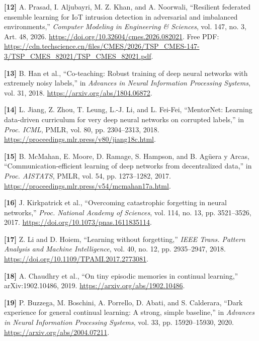 \documentclass[10pt,a4paper]{article}
\begin{document}
\par\noindent\textbf{[12]}  A. Prasad, I. Aljubayri, M. Z. Khan, and A. Noorwali, ``Resilient federated ensemble learning for IoT intrusion detection in adversarial and imbalanced environments,'' \emph{Computer Modeling in Engineering \& Sciences}, vol. 147, no. 3, Art. 48, 2026. \url{https://doi.org/10.32604/cmes.2026.082021}. Free PDF: \url{https://cdn.techscience.cn/files/CMES/2026/TSP_CMES-147-3/TSP_CMES_82021/TSP_CMES_82021.pdf}.

\par\noindent\textbf{[13]}  B. Han et al., ``Co-teaching: Robust training of deep neural networks with extremely noisy labels,'' in \emph{Advances in Neural Information Processing Systems}, vol. 31, 2018. \url{https://arxiv.org/abs/1804.06872}.


\par\noindent\textbf{[14]}  L. Jiang, Z. Zhou, T. Leung, L.-J. Li, and L. Fei-Fei, ``MentorNet: Learning data-driven curriculum for very deep neural networks on corrupted labels,'' in \emph{Proc. ICML}, PMLR, vol. 80, pp. 2304--2313, 2018. \url{https://proceedings.mlr.press/v80/jiang18c.html}.

\par\noindent\textbf{[15]}  B. McMahan, E. Moore, D. Ramage, S. Hampson, and B. Ag\"uera y Arcas, ``Communication-efficient learning of deep networks from decentralized data,'' in \emph{Proc. AISTATS}, PMLR, vol. 54, pp. 1273--1282, 2017. \url{https://proceedings.mlr.press/v54/mcmahan17a.html}.

\par\noindent\textbf{[16]}  J. Kirkpatrick et al., ``Overcoming catastrophic forgetting in neural networks,'' \emph{Proc. National Academy of Sciences}, vol. 114, no. 13, pp. 3521--3526, 2017. \url{https://doi.org/10.1073/pnas.1611835114}.

\par\noindent\textbf{[17]}  Z. Li and D. Hoiem, ``Learning without forgetting,'' \emph{IEEE Trans. Pattern Analysis and Machine Intelligence}, vol. 40, no. 12, pp. 2935--2947, 2018. \url{https://doi.org/10.1109/TPAMI.2017.2773081}.

\par\noindent\textbf{[18]}  A. Chaudhry et al., ``On tiny episodic memories in continual learning,'' arXiv:1902.10486, 2019. \url{https://arxiv.org/abs/1902.10486}.

\par\noindent\textbf{[19]}  P. Buzzega, M. Boschini, A. Porrello, D. Abati, and S. Calderara, ``Dark experience for general continual learning: A strong, simple baseline,'' in \emph{Advances in Neural Information Processing Systems}, vol. 33, pp. 15920--15930, 2020. \url{https://arxiv.org/abs/2004.07211}.
\end{document}
